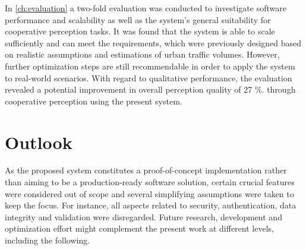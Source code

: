 In \cref{ch:evaluation} a two-fold evaluation was conducted to investigate software performance and scalability as well as the system's general suitability for cooperative perception tasks. It was found that the system is able to scale sufficiently and can meet the requirements, which were previously designed based on realistic assumptions and estimations of urban traffic volumes. However, further optimization steps are still recommendable in order to apply the system to real-world scenarios. With regard to qualitative performance, the evaluation revealed a potential improvement in overall perception quality of 27 \%. through cooperative perception using the present system. 

\section{Outlook}
\label{sec:conclusion:outlook}
As the proposed system constitutes a proof-of-concept implementation rather than aiming to be a production-ready software solution, certain crucial features were considered out of scope and several simplifying assumptions were taken to keep the focus. For instance, all aspects related to security, authentication, data integrity and validation were disregarded. Future research, development and optimization effort might complement the present work at different levels, including the following. 

